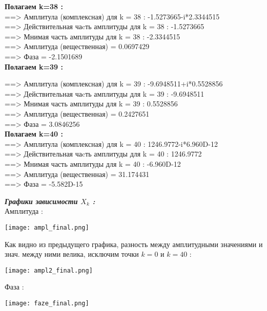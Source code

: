 \documentclass[a4paper,11pt]{article}
\begin{document}
\begin{flushleft}
\textbf{Полагаем k=38 :\\} 
 ==> Амплитула (комплексная) для k = 38 : -1.5273665-i*2.3344515\\ 
 ==> Действительная чаcть амплитуды  для k = 38 : -1.5273665\\ 
 ==> Мнимая часть амплитуды  для k = 38 : -2.3344515\\ 
 ==> Амплитуда (вещественная) = 0.0697429\\ 
 ==> Фаза = -2.1501689\\ 

\textbf{Полагаем k=39 :\\} 

 ==> Амплитула (комплексная) для k = 39 : -9.6948511+i*0.5528856\\ 
 ==> Действительная чаcть амплитуды  для k = 39 : -9.6948511\\ 
 ==> Мнимая часть амплитуды  для k = 39 : 0.5528856\\ 
 ==> Амплитуда (вещественная) = 0.2427651\\ 
 ==> Фаза = 3.0846256\\ 

\textbf{Полагаем k=40 :\\} 
 ==> Амплитула (комплексная) для k = 40 :  1246.9772-i*6.960D-12\\ 
 ==> Действительная чаcть амплитуды  для k = 40 : 1246.9772\\ 
 ==> Мнимая часть амплитуды  для k = 40 : -6.960D-12\\ 
 ==> Амплитуда (вещественная) = 31.174431\\ 
 ==> Фаза = -5.582D-15\\ 

 		
		\end{flushleft}
		\newpage
		\begin{flushleft}
		\textit{\textbf{Графики зависимости ${X_k}$ :}}
		\\
		\hangindent=1.5cm  \noindent
		Амплитуда :
		\begin{center}
			\texttt{[image: ampl\_final.png]}
		\end{center}
		Как видно из предыдущего графика, разность между амплитудными значениями и знач. между ними велика, исключим точки ${k=0}$ и ${k=40}$ :
		\begin{center}
			\texttt{[image: ampl2\_final.png]}	
		\end{center}
		Фаза :
		\begin{center}
			\texttt{[image: faze\_final.png]}
		\end{center} 
		\end{flushleft}				
\end{document}
